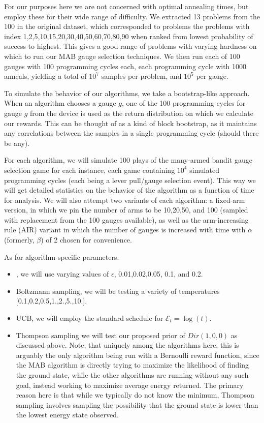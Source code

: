 For our purposes here we are not concerned with optimal annealing times, but employ these for their wide range of difficulty. We extracted 13 problems from the 100 in the original dataset, which corresponded to problems the problems with index 1,2,5,10,15,20,30,40,50,60,70,80,90 when ranked from lowest probability of success to highest. This gives a good range of problems with varying hardness on which to run our MAB gauge selection techniques. We then run each of 100 gauges with 100 programming cycles each, each programming cycle with 1000 anneals, yielding a total of $10^7$ samples per problem, and $10^5$ per gauge.

To simulate the behavior of our algorithms, we take a bootstrap-like approach. When an algorithm chooses a gauge $g$, one of the 100 programming cycles for gauge $g$ from the device is used as the return distribution on which we calculate our rewards. This can be thought of as a kind of block bootstrap, as it maintains any correlations between the samples in a single programming cycle (should there be any).

For each algorithm, we will simulate 100 plays of the many-armed bandit gauge selection game for each instance, each game containing $10^4$ simulated programming cycles (each being a lever pull/gauge selection event). This way we will get detailed statistics on the behavior of the algorithm as a function of time for analysis. We will also attempt two variants of each algorithm: a fixed-arm version, in which we pin the number of arms to be 10,20,50, and 100 (sampled with replacement from the 100 gauges available), as well as the arm-increasing rule (AIR) variant in which the number of gauges is increased with time with $\alpha$ (formerly, $\beta$) of 2 chosen for convenience.

As for algorithm-specific parameters: 
\begin{itemize}
\item  \eg, we will use varying values of $\epsilon$, 0.01,0.02,0.05, 0.1, and 0.2.
\item Boltzmann sampling, we will be testing a variety of temperatures [0.1,0.2,0.5,1.,2.,5.,10.].
\item UCB, we will employ the standard schedule for $\mathcal{E}_t=\log(t)$.
\item Thompson sampling we will test our proposed prior of $Dir(1,0,0)$ as discussed above. Note, that uniquely among the algorithms here, this is arguably the only algorithm being run with a Bernoulli reward function, since the MAB algorithm is directly trying to maximize the likelihood of finding the ground state, while the other algorithms are running without any such goal, instead working to maximize average energy returned. The primary reason here is that while we typically do not know the minimum, Thompson sampling involves sampling the possibility that the ground state is lower than the lowest energy state observed.
\end{itemize}

